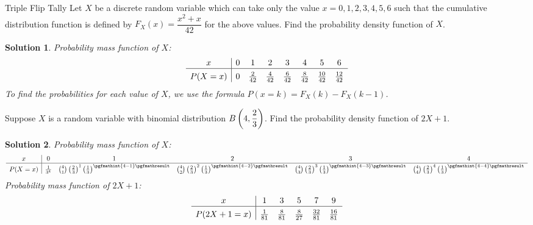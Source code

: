 \documentclass[11pt]{article}
\newtheorem*{solution}{Solution}
\theoremstyle{mystyle}
\newcommand{\PPFour}[1]{\binom{4}{#1} \left( \frac{2}{3} \right)^{#1}\left(\frac{1}{3}\right)^{\pgfmathint{4-#1}\pgfmathresult}}
\renewcommand{\|}{\mid}
\begin{document}
\begin{psproblem}{Triple Flip Tally}{}
    Let $X$ be a discrete random variable which can take only the value $x = 0, 1, 2, 3, 4, 5, 6$ such that the cumulative
    distribution function is defined by $F_X(x) = \dfrac{x^2 + x}{42}$ for the above values. Find the probability density function of $X$.
\end{psproblem}

\begin{solution}
    Probability mass function of $X$: \[
    \begin{array}{c|ccccccc}
        x & 0 & 1 & 2 & 3 & 4 & 5 & 6 \\ \hline
        \rule{0pt}{12pt} %
        P(X = x) & 0 & \frac{2}{42} & \frac{4}{42} & \frac{6}{42} & \frac{8}{42} & \frac{10}{42} & \frac{12}{42}
    \end{array}
    \]
    To find the probabilities for each value of $X$, we use the formula $P(x=k)=F_X(k)-F_X(k-1)$.
\end{solution}

\begin{psproblem}{}{}
    Suppose $X$ is a random variable with binomial distribution $B \displaystyle \left( 4, \dfrac{2}{3} \displaystyle \right)$. Find the probability density function of
    $2X + 1$.
\end{psproblem}
\begin{solution}
    Probability mass function of $X$: \[
    \begin{array}{c|ccccc}
        x & 0 & 1 & 2 & 3 & 4 \\ \hline
        \rule{0pt}{12pt} %
        P(X = x) & \frac{1}{3^4} & \PPFour{1} & \PPFour{2} & \PPFour{3} & \PPFour{4}
    \end{array}
    \]
    Probability mass function of $2X + 1$: \[
    \begin{array}{c|ccccc}
        x & 1 & 3 & 5 & 7 & 9 \\ \hline
        \rule{0pt}{12pt} %
        P(2X + 1 = x) & \frac{1}{81} & \frac{8}{81} & \frac{8}{27} & \frac{32}{81} & \frac{16}{81}
    \end{array}
    \]
\end{solution}
\end{document}
